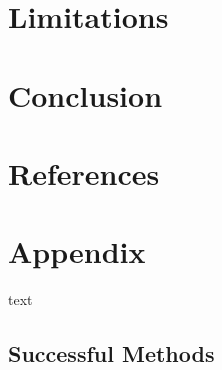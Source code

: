 \documentclass[11pt, a4paper]{article}
\begin{document}
\pagebreak 
\section{Limitations}

























\pagebreak 
\section{Conclusion}


















\pagebreak
\section{References}



\renewcommand{\bibsection}{}




\pagebreak
\appendix
\section{Appendix}
\par
text





\subsection{Successful Methods}
\end{document}
